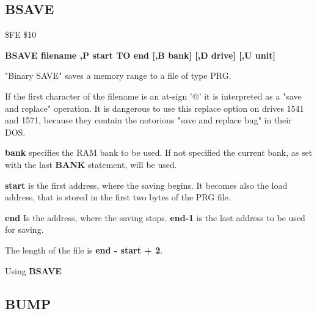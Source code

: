\subsection{BSAVE}
\begin{description}[leftmargin=3cm,style=nextline]
\item [Token:] \$FE \$10
\item [Format:] {\bf BSAVE filename ,P start TO end
                [,B bank] [,D drive] [,U unit] }
\item [Usage:]
   "Binary SAVE" saves a memory range to
   a file of type PRG.

   \filenamedefinition
   If the first character of the filename is an at-sign '@' it
   is interpreted as a "save and replace" operation. It is dangerous
   to use this replace option on drives 1541 and 1571, because they
   contain the notorious "save and replace bug" in their DOS.

   {\bf bank} specifies the RAM bank to be used.
   If not specified the current bank, as set with the last
   {\bf BANK} statement, will be used.

   {\bf start} is the first address, where the saving begins.
   It becomes also the load address,
   that is stored in the first two bytes of the PRG file.

   {\bf end} Is the address, where the saving stops.
   {\bf end-1} is the last address to be used for saving.

   \drivedefinition

   \unitdefinition

\item [Remarks:]
   The length of the file is {\bf end - start + 2}.

\item [Example:] Using {\bf BSAVE}
\end{description}


\newpage
\subsection{BUMP}

